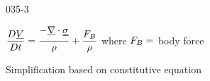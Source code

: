 \begin{mitframe}{035-3}

\begin{listone}
\item $\dfrac{\elecdisplace\uline{\vol}}{\elecdisplace{t}}=\dfrac{-\gradop\cdot{\uuline{\molecrad}}}{\dens}+\dfrac{\force_{\exergy}}{\dens}$ where $\force_{\exergy}=$ body force
			\begin{listtwo}
            
            \item Simplification based on constitutive equation

			\end{listtwo}
\end{listone}
\end{mitframe}